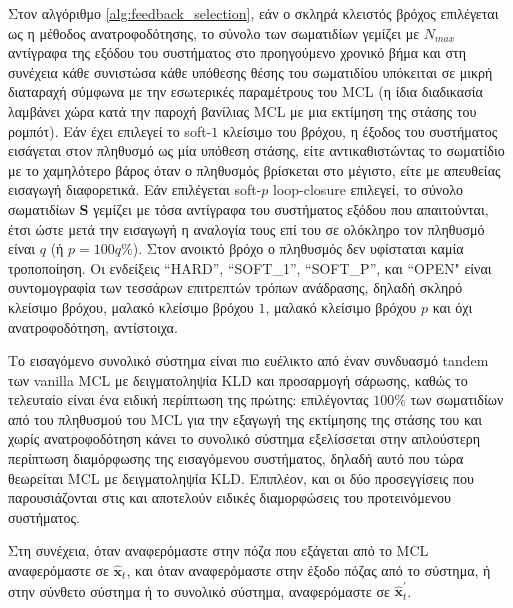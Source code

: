 Στον αλγόριθμο \ref{alg:feedback_selection}, εάν ο σκληρά κλειστός βρόχος επιλέγεται ως
η μέθοδος ανατροφοδότησης, το σύνολο των σωματιδίων γεμίζει με $N_{max}$ αντίγραφα
της εξόδου του συστήματος στο προηγούμενο χρονικό βήμα και στη συνέχεια κάθε συνιστώσα κάθε
υπόθεσης θέσης του σωματιδίου υπόκειται σε μικρή διαταραχή σύμφωνα με την
εσωτερικές παραμέτρους του MCL (η ίδια διαδικασία λαμβάνει χώρα κατά την παροχή βανίλιας
MCL με μια εκτίμηση της στάσης του ρομπότ). Εάν έχει επιλεγεί το soft-$1$ κλείσιμο του βρόχου,
η έξοδος του συστήματος εισάγεται στον πληθυσμό ως μία υπόθεση στάσης,
είτε αντικαθιστώντας το σωματίδιο με το χαμηλότερο βάρος όταν ο πληθυσμός βρίσκεται στο
μέγιστο, είτε με απευθείας εισαγωγή διαφορετικά. Εάν επιλέγεται soft-$p$ loop-closure
επιλεγεί, το σύνολο σωματιδίων $\bm{S}$ γεμίζει με τόσα αντίγραφα του συστήματος
εξόδου που απαιτούνται, έτσι ώστε μετά την εισαγωγή η αναλογία τους επί του
σε ολόκληρο τον πληθυσμό είναι $q$ (ή $p = 100 q\%$). Στον ανοικτό βρόχο ο πληθυσμός
δεν υφίσταται καμία τροποποίηση. Οι ενδείξεις ``HARD'', ``SOFT\_1'', ``SOFT\_P'', και
``OPEN" είναι συντομογραφία των τεσσάρων επιτρεπτών τρόπων ανάδρασης, δηλαδή
σκληρό κλείσιμο βρόχου, μαλακό κλείσιμο βρόχου $1$, μαλακό κλείσιμο βρόχου $p$ και όχι
ανατροφοδότηση, αντίστοιχα.

Το εισαγόμενο συνολικό σύστημα είναι πιο ευέλικτο από έναν συνδυασμό tandem των
vanilla MCL με δειγματοληψία KLD και προσαρμογή σάρωσης, καθώς το τελευταίο είναι ένα
ειδική περίπτωση της πρώτης: επιλέγοντας $100\%$ των σωματιδίων από
του πληθυσμού του MCL για την εξαγωγή της εκτίμησης της στάσης του και χωρίς ανατροφοδότηση κάνει
το συνολικό σύστημα εξελίσσεται στην απλούστερη περίπτωση διαμόρφωσης της
εισαγόμενου συστήματος, δηλαδή αυτό που τώρα θεωρείται MCL με δειγματοληψία KLD.
Επιπλέον, και οι δύο προσεγγίσεις που παρουσιάζονται στις \cite{paid_original} και
\cite{gangpeng} αποτελούν ειδικές διαμορφώσεις του προτεινόμενου συστήματος.

Στη συνέχεια, όταν αναφερόμαστε στην πόζα που εξάγεται από το MCL αναφερόμαστε σε
$\hat{\bm{x}}_t$, και όταν αναφερόμαστε στην έξοδο πόζας από το σύστημα, ή στην
σύνθετο σύστημα ή το συνολικό σύστημα, αναφερόμαστε σε $\hat{\bm{x}}^{\prime}_t$.
